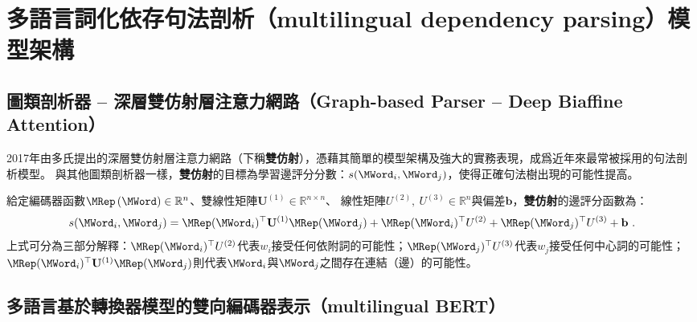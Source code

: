 \label{chapter:lex_parsing}
\section{多語言詞化依存句法剖析（multilingual dependency parsing）模型架構}
\subsection{圖類剖析器 -- 深層雙仿射層注意力網路（Graph-based Parser -- Deep Biaffine Attention）}

2017年由多氏\cite{Dozat2017DeepBA}提出的深層雙仿射層注意力網路（下稱\textbf{雙仿射}），憑藉其簡單的模型架構及強大的實務表現，成爲近年來最常被採用的句法剖析模型。
與其他圖類剖析器一樣，\textbf{雙仿射}的目標為學習邊評分分數：$s(\MWord_{i}, \MWord_{j})$，使得正確句法樹出現的可能性提高。

給定編碼器函數$\MRep\left(\MWord\right) \in \mathbb{R}^{n}$、雙線性矩陣$\mathbf{U}^{(1)} \in \mathbb{R}^{n \times n}$、
線性矩陣$U^{(2)},\ U^{(3)} \in \mathbb{R}^{n} $與偏差$\mathbf{b}$，\textbf{雙仿射}的邊評分函數為：
\begin{equation}
    s(\MWord_{i}, \MWord_{j}) = \MRep(\MWord_{i})^{\top} \mathbf{U}^{(1)} \MRep(\MWord_{j}) + \MRep(\MWord_{i})^{\top} U^{(2)} + \MRep(\MWord_{j})^{\top} U^{(3)} + \mathbf{b}\ .
\end{equation}
上式可分為三部分解釋：$\MRep(\MWord_{i})^{\top} U^{(2)}$代表$w_{i}$接受任何依附詞的可能性；$\MRep(\MWord_{j})^{\top} U^{(3)}$代表$w_{j}$接受任何中心詞的可能性；
$\MRep(\MWord_{i})^{\top} \mathbf{U}^{(1)} \MRep(\MWord_{j})$則代表$\MWord_{i}$與$\MWord_{j}$之間存在連結（邊）的可能性。

\subsection{多語言基於轉換器模型的雙向編碼器表示（multilingual BERT）}

